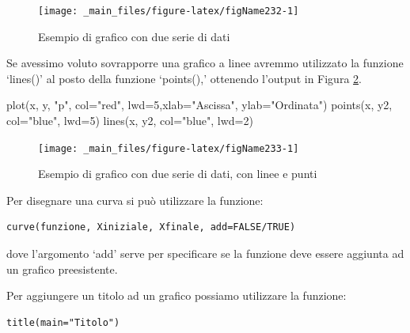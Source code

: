 \documentclass[a4paper,12pt,oneside]{book}
\newenvironment{Shaded}{\begin{snugshade}}{\end{snugshade}}
\newcommand{\DecValTok}[1]{#1}
\newcommand{\StringTok}[1]{#1}
\newcommand{\FunctionTok}[1]{#1}
\newcommand{\AttributeTok}[1]{#1}
\newcommand{\NormalTok}[1]{#1}
\begin{document}
\begin{figure}

{\centering \texttt{[image: \_main\_files/figure-latex/figName232-1]} 

}

\caption{Esempio di grafico con due serie di dati}\label{fig:figName232}
\end{figure}

Se avessimo voluto sovrapporre una grafico a linee avremmo utilizzato la funzione `lines()' al posto della funzione `points(),' ottenendo l'output in Figura \ref{fig:figName233}.

\begin{Shaded}
\begin{Highlighting}[]
\FunctionTok{plot}\NormalTok{(x, y, }\StringTok{"p"}\NormalTok{, }\AttributeTok{col=}\StringTok{"red"}\NormalTok{, }\AttributeTok{lwd=}\DecValTok{5}\NormalTok{,}\AttributeTok{xlab=}\StringTok{"Ascissa"}\NormalTok{, }\AttributeTok{ylab=}\StringTok{"Ordinata"}\NormalTok{)}
\FunctionTok{points}\NormalTok{(x, y2, }\AttributeTok{col=}\StringTok{"blue"}\NormalTok{, }\AttributeTok{lwd=}\DecValTok{5}\NormalTok{)}
\FunctionTok{lines}\NormalTok{(x, y2, }\AttributeTok{col=}\StringTok{"blue"}\NormalTok{, }\AttributeTok{lwd=}\DecValTok{2}\NormalTok{)}
\end{Highlighting}
\end{Shaded}

\begin{figure}

{\centering \texttt{[image: \_main\_files/figure-latex/figName233-1]} 

}

\caption{Esempio di grafico con due serie di dati, con linee e punti}\label{fig:figName233}
\end{figure}

Per disegnare una curva si può utilizzare la funzione:

\begin{verbatim}
curve(funzione, Xiniziale, Xfinale, add=FALSE/TRUE)
\end{verbatim}

dove l'argomento `add' serve per specificare se la funzione deve essere aggiunta ad un grafico preesistente.

Per aggiungere un titolo ad un grafico possiamo utilizzare la funzione:

\begin{verbatim}
title(main="Titolo")
\end{verbatim}
\end{document}
